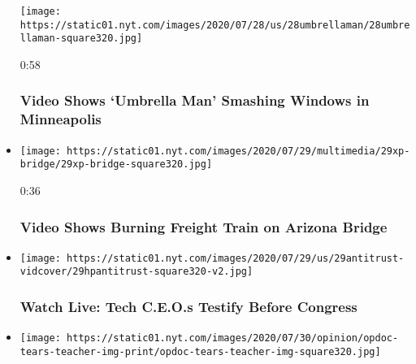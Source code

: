 \begin{itemize}
  \texttt{[image: https://static01.nyt.com/images/2020/07/28/us/28umbrellaman/28umbrellaman-square320.jpg]}

  0:58

  \hypertarget{video-shows-umbrella-man-smashing-windows-in-minneapolis}{%
  \subsubsection{Video Shows `Umbrella Man' Smashing Windows in
  Minneapolis}\label{video-shows-umbrella-man-smashing-windows-in-minneapolis}}
\item
  \href{https://www.nytimes.com/video/us/100000007262683/tempe-arizona-train-fire.html?action=click\&module=video-series-bar\&region=header\&pgtype=Article\&playlistId=video/latest-video}{}

  \texttt{[image: https://static01.nyt.com/images/2020/07/29/multimedia/29xp-bridge/29xp-bridge-square320.jpg]}

  0:36

  \hypertarget{video-shows-burning-freight-train-on-arizona-bridge}{%
  \subsubsection{Video Shows Burning Freight Train on Arizona
  Bridge}\label{video-shows-burning-freight-train-on-arizona-bridge}}
\item
  \href{https://www.nytimes.com/video/us/politics/100000007262236/congress-tech-antitrust-hearings-live.html?action=click\&module=video-series-bar\&region=header\&pgtype=Article\&playlistId=video/latest-video}{}

  \texttt{[image: https://static01.nyt.com/images/2020/07/29/us/29antitrust-vidcover/29hpantitrust-square320-v2.jpg]}

  \hypertarget{watch-live-tech-ceos-testify-before-congress}{%
  \subsubsection{Watch Live: Tech C.E.O.s Testify Before
  Congress}\label{watch-live-tech-ceos-testify-before-congress}}
\item
  \href{https://www.nytimes.com/video/opinion/100000007247238/tears-teacher.html?action=click\&module=video-series-bar\&region=header\&pgtype=Article\&playlistId=video/latest-video}{}

  \texttt{[image: https://static01.nyt.com/images/2020/07/30/opinion/opdoc-tears-teacher-img-print/opdoc-tears-teacher-img-square320.jpg]}


\end{itemize}
